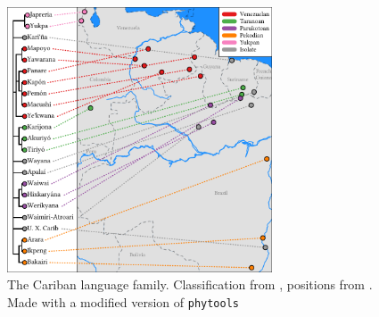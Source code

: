 \begin{figure}[htbp]
	\centering
\includegraphics[width=0.7\textwidth]{floats/genealogical_map}
	\caption[The Cariban language family]{The Cariban language family. Classification from \textcite{matter2021cariban}, positions from \textcite{glottolog}. Made with a modified version of \texttt{phytools} \parencite{phytools2012}}
	\label{fig:phylomap}
\end{figure}